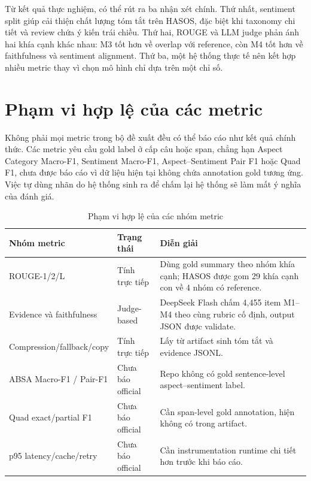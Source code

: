 Từ kết quả thực nghiệm, có thể rút ra ba nhận xét chính. Thứ nhất, sentiment split giúp cải thiện chất lượng tóm tắt trên HASOS, đặc biệt khi taxonomy chi tiết và review chứa ý kiến trái chiều. Thứ hai, ROUGE và LLM judge phản ánh hai khía cạnh khác nhau: M3 tốt hơn về overlap với reference, còn M4 tốt hơn về faithfulness và sentiment alignment. Thứ ba, một hệ thống thực tế nên kết hợp nhiều metric thay vì chọn mô hình chỉ dựa trên một chỉ số.

\section{Phạm vi hợp lệ của các metric}

Không phải mọi metric trong bộ đề xuất đều có thể báo cáo như kết quả chính thức. Các metric yêu cầu gold label ở cấp câu hoặc span, chẳng hạn Aspect Category Macro-F1, Sentiment Macro-F1, Aspect--Sentiment Pair F1 hoặc Quad F1, chưa được báo cáo vì dữ liệu hiện tại không chứa annotation gold tương ứng. Việc tự dùng nhãn do hệ thống sinh ra để chấm lại hệ thống sẽ làm mất ý nghĩa của đánh giá.

\begin{table}[H]
\centering
\caption{Phạm vi hợp lệ của các nhóm metric}
\label{tab:metric-availability}
\begin{tabularx}{\textwidth}{l l X}
\toprule
\textbf{Nhóm metric} & \textbf{Trạng thái} & \textbf{Diễn giải} \\
\midrule
ROUGE-1/2/L & Tính trực tiếp & Dùng gold summary theo nhóm khía cạnh; HASOS được gom 29 khía cạnh con về 4 nhóm có reference. \\
Evidence và faithfulness & Judge-based & DeepSeek Flash chấm 4,455 item M1--M4 theo cùng rubric cố định, output JSON được validate. \\
Compression/fallback/copy & Tính trực tiếp & Lấy từ artifact sinh tóm tắt và evidence JSONL. \\
ABSA Macro-F1 / Pair-F1 & Chưa báo official & Repo không có gold sentence-level aspect--sentiment label. \\
Quad exact/partial F1 & Chưa báo official & Cần span-level gold annotation, hiện không có trong artifact. \\
p95 latency/cache/retry & Chưa báo official & Cần instrumentation runtime chi tiết hơn trước khi báo cáo. \\
\bottomrule
\end{tabularx}
\end{table}

